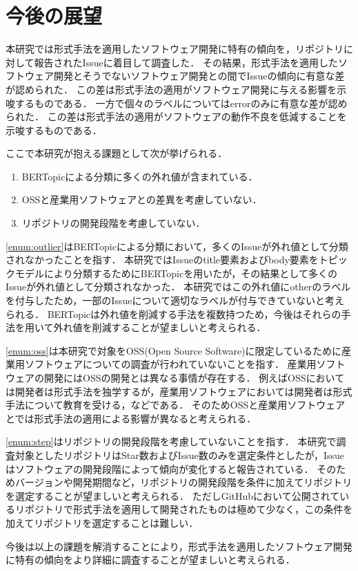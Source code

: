 \documentclass[main]{subfiles}
\begin{document}
\chapter{今後の展望}

本研究では形式手法を適用したソフトウェア開発に特有の傾向を，リポジトリに対して報告されたIssueに着目して調査した．
その結果，形式手法を適用したソフトウェア開発とそうでないソフトウェア開発との間でIssueの傾向に有意な差が認められた．
この差は形式手法の適用がソフトウェア開発に与える影響を示唆するものである．
一方で個々のラベルについてはerrorのみに有意な差が認められた．
この差は形式手法の適用がソフトウェアの動作不良を低減することを示唆するものである．

ここで本研究が抱える課題として次が挙げられる．

\begin{enumerate}[label=課題\arabic*.]
	\item \label{enum:outlier} BERTopicによる分類に多くの外れ値が含まれている．
	\item \label{enum:oss} OSSと産業用ソフトウェアとの差異を考慮していない．
	\item \label{enum:step} リポジトリの開発段階を考慮していない．
\end{enumerate}

\ref{enum:outlier}はBERTopicによる分類において，多くのIssueが外れ値として分類されなかったことを指す．
本研究ではIssueのtitle要素およびbody要素をトピックモデルにより分類するためにBERTopicを用いたが，その結果として多くのIssueが外れ値として分類されなかった．
本研究ではこの外れ値にotherのラベルを付与したため，一部のIssueについて適切なラベルが付与できていないと考えられる．
BERTopicは外れ値を削減する手法を複数持つため，今後はそれらの手法を用いて外れ値を削減することが望ましいと考えられる．

\ref{enum:oss}は本研究で対象をOSS(Open Source Software)に限定しているために産業用ソフトウェアについての調査が行われていないことを指す．
産業用ソフトウェアの開発にはOSSの開発とは異なる事情が存在する．
例えばOSSにおいては開発者は形式手法を独学するが，産業用ソフトウェアにおいては開発者は形式手法について教育を受ける，などである．
そのためOSSと産業用ソフトウェアとでは形式手法の適用による影響が異なると考えられる．

\ref{enum:step}はリポジトリの開発段階を考慮していないことを指す．
本研究で調査対象としたリポジトリはStar数およびIssue数のみを選定条件としたが，Issueはソフトウェアの開発段階によって傾向が変化すると報告されている\cite{bissyande:2013}．
そのためバージョンや開発期間など，リポジトリの開発段階を条件に加えてリポジトリを選定することが望ましいと考えられる．
ただしGitHubにおいて公開されているリポジトリで形式手法を適用して開発されたものは極めて少なく，この条件を加えてリポジトリを選定することは難しい．

今後は以上の課題を解消することにより，形式手法を適用したソフトウェア開発に特有の傾向をより詳細に調査することが望ましいと考えられる．
\end{document}
